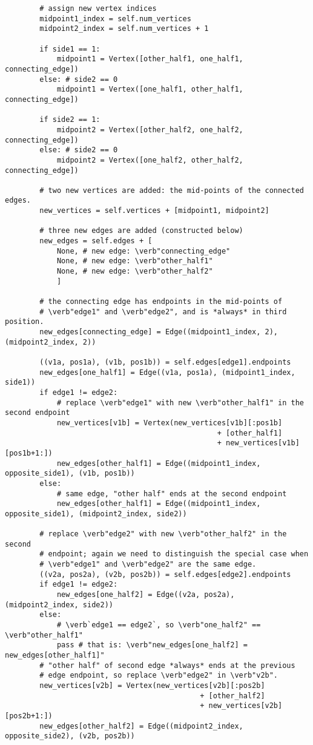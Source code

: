 \begin{lstlisting}
        # assign new vertex indices
        midpoint1_index = self.num_vertices
        midpoint2_index = self.num_vertices + 1

        if side1 == 1:
            midpoint1 = Vertex([other_half1, one_half1, connecting_edge])
        else: # side2 == 0
            midpoint1 = Vertex([one_half1, other_half1, connecting_edge])

        if side2 == 1:
            midpoint2 = Vertex([other_half2, one_half2, connecting_edge])
        else: # side2 == 0
            midpoint2 = Vertex([one_half2, other_half2, connecting_edge])

        # two new vertices are added: the mid-points of the connected edges.
        new_vertices = self.vertices + [midpoint1, midpoint2]

        # three new edges are added (constructed below)
        new_edges = self.edges + [
            None, # new edge: \verb"connecting_edge"
            None, # new edge: \verb"other_half1"
            None, # new edge: \verb"other_half2"
            ]
        
        # the connecting edge has endpoints in the mid-points of
        # \verb"edge1" and \verb"edge2", and is *always* in third position.
        new_edges[connecting_edge] = Edge((midpoint1_index, 2), (midpoint2_index, 2))

        ((v1a, pos1a), (v1b, pos1b)) = self.edges[edge1].endpoints
        new_edges[one_half1] = Edge((v1a, pos1a), (midpoint1_index, side1))
        if edge1 != edge2:
            # replace \verb"edge1" with new \verb"other_half1" in the second endpoint
            new_vertices[v1b] = Vertex(new_vertices[v1b][:pos1b]
                                                 + [other_half1]
                                                 + new_vertices[v1b][pos1b+1:])
            new_edges[other_half1] = Edge((midpoint1_index, opposite_side1), (v1b, pos1b))
        else:
            # same edge, "other half" ends at the second endpoint
            new_edges[other_half1] = Edge((midpoint1_index, opposite_side1), (midpoint2_index, side2))

        # replace \verb"edge2" with new \verb"other_half2" in the second
        # endpoint; again we need to distinguish the special case when
        # \verb"edge1" and \verb"edge2" are the same edge.
        ((v2a, pos2a), (v2b, pos2b)) = self.edges[edge2].endpoints
        if edge1 != edge2:
            new_edges[one_half2] = Edge((v2a, pos2a), (midpoint2_index, side2))
        else:
            # \verb`edge1 == edge2`, so \verb"one_half2" == \verb"other_half1"
            pass # that is: \verb"new_edges[one_half2] = new_edges[other_half1]"
        # "other half" of second edge *always* ends at the previous
        # edge endpoint, so replace \verb"edge2" in \verb"v2b".
        new_vertices[v2b] = Vertex(new_vertices[v2b][:pos2b]
                                             + [other_half2]
                                             + new_vertices[v2b][pos2b+1:])
        new_edges[other_half2] = Edge((midpoint2_index, opposite_side2), (v2b, pos2b))


\end{lstlisting}

